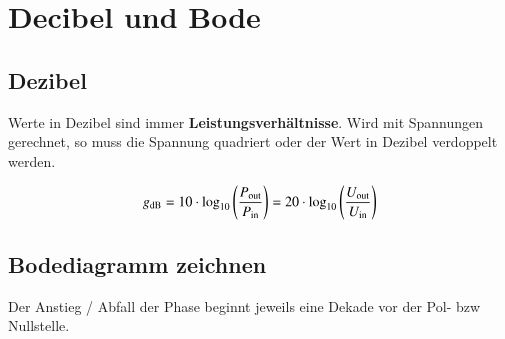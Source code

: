 \section{Decibel und Bode}


\subsection{Dezibel}
Werte in Dezibel sind immer \textbf{Leistungsverhältnisse}. 
Wird mit Spannungen gerechnet, so muss die Spannung quadriert oder der Wert in Dezibel verdoppelt werden.

\[
    g_{\qty{}{\decibel}} = 10 \cdot \log_{10} \left( \frac{P_{\rm out}}{P_{\rm in}} \right) = 20 \cdot \log_{10} \left( \frac{U_{\rm out}}{U_{\rm in}} \right)
\]


\subsection{Bodediagramm zeichnen}

\medskip%

Der Anstieg / Abfall der Phase beginnt jeweils eine Dekade vor der Pol- bzw Nullstelle.

